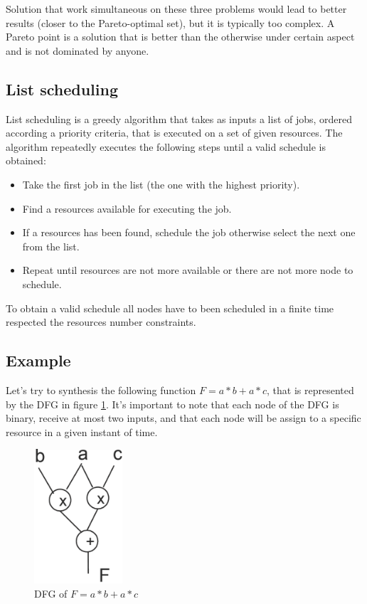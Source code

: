 Solution that work simultaneous on these three problems would lead to better results (closer to the Pareto-optimal set), but it is typically too complex.
A Pareto point is a solution that is better than the otherwise under certain aspect and is not dominated by anyone.

\subsection{List scheduling}
\label{list_scheduling}

List scheduling is a greedy algorithm that takes as inputs a list of jobs, ordered according a priority criteria, that is executed on a set of given resources. 
The algorithm repeatedly executes the following steps until a valid schedule is obtained:
\begin{itemize}
    \item Take the first job in the list (the one with the highest priority).
    \item Find a resources available for executing the job.
    \item If a resources has been found, schedule the job otherwise select the next one from the list.
    \item Repeat until resources are not more available or there are not more node to schedule.
\end{itemize}

To obtain a valid schedule all nodes have to been scheduled in a finite time respected the resources number constraints.

\subsection{Example}
Let's try to synthesis the following function $F = a*b + a*c$, that is represented by the DFG in figure \ref*{fig:DFG}. It's important to note that each node of the DFG is binary, receive at most two inputs, and that each node will be assign to a specific resource in a given instant of time.

\begin{figure}[h]
\centering
\includegraphics[height=5cm]{chapters/figures/dfg.png}
\caption{DFG of $F = a*b + a*c$}
\label{fig:DFG}
\end{figure}

